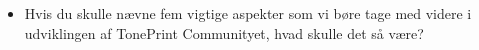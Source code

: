 \begin{itemize}
  \item Hvis du skulle nævne fem vigtige aspekter som vi børe tage med videre i udviklingen af TonePrint Communityet, hvad skulle det så være?
\end{itemize}
%
%
%
%
